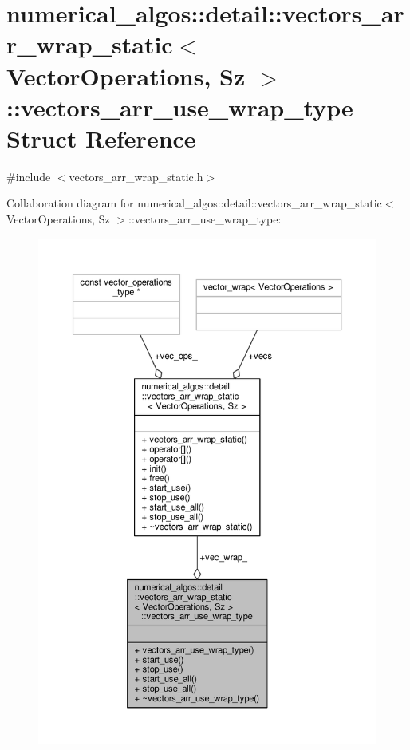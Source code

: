 \hypertarget{structnumerical__algos_1_1detail_1_1vectors__arr__wrap__static_1_1vectors__arr__use__wrap__type}{\section{numerical\-\_\-algos\-:\-:detail\-:\-:vectors\-\_\-arr\-\_\-wrap\-\_\-static$<$ Vector\-Operations, Sz $>$\-:\-:vectors\-\_\-arr\-\_\-use\-\_\-wrap\-\_\-type Struct Reference}
\label{structnumerical__algos_1_1detail_1_1vectors__arr__wrap__static_1_1vectors__arr__use__wrap__type}
}


{\ttfamily \#include $<$vectors\-\_\-arr\-\_\-wrap\-\_\-static.\-h$>$}



Collaboration diagram for numerical\-\_\-algos\-:\-:detail\-:\-:vectors\-\_\-arr\-\_\-wrap\-\_\-static$<$ Vector\-Operations, Sz $>$\-:\-:vectors\-\_\-arr\-\_\-use\-\_\-wrap\-\_\-type\-:\nopagebreak
\begin{figure}[H]
\begin{center}
\leavevmode
\includegraphics[width=350pt]{structnumerical__algos_1_1detail_1_1vectors__arr__wrap__static_1_1vectors__arr__use__wrap__type__coll__graph}
\end{center}
\end{figure}
